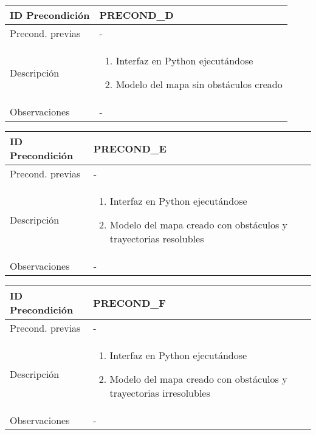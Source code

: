 \sffamily \small \begin{center} \begin{tabular} {|p{3cm}|p{9cm}|}
    \hline \rowcolor{precond_header_color}
        ID Precondición     & PRECOND\_D \\
    \hline
        Precond. previas    & - \\
    \hline
        Descripción         & \begin{enumerate}
                                \item Interfaz en Python ejecutándose
                                \item Modelo del mapa sin obstáculos creado
                            \end{enumerate} \\
    \hline
        Observaciones       & - \\
    \hline
\end{tabular} \end{center} \normalsize \normalfont


\sffamily \small \begin{center} \begin{tabular} {|p{3cm}|p{9cm}|}
    \hline \rowcolor{precond_header_color}
        ID Precondición     & PRECOND\_E \\
    \hline
        Precond. previas    & - \\
    \hline
        Descripción         & \begin{enumerate}
                                \item Interfaz en Python ejecutándose
                                \item Modelo del mapa creado con obstáculos y trayectorias resolubles
                            \end{enumerate} \\
    \hline
        Observaciones       & - \\
    \hline
\end{tabular} \end{center} \normalsize \normalfont


\sffamily \small \begin{center} \begin{tabular} {|p{3cm}|p{9cm}|}
    \hline \rowcolor{precond_header_color}
        ID Precondición     & PRECOND\_F \\
    \hline
        Precond. previas    & - \\
    \hline
        Descripción         & \begin{enumerate}
                                \item Interfaz en Python ejecutándose
                                \item Modelo del mapa creado con obstáculos y trayectorias irresolubles
                            \end{enumerate} \\
    \hline
        Observaciones       & - \\
    \hline
\end{tabular} \end{center} \normalsize \normalfont


